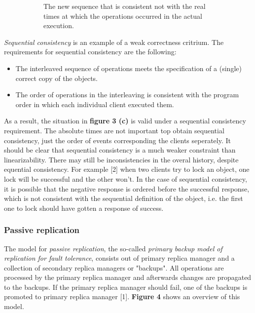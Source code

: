 \begin{figure}
\begin{subfigure}[t]{0.3\textwidth}
                                        \caption{The new sequence that is consistent not with the real times at which the operations occurred in the actual execution.}
                                        \label{figure:linearizability:c}
        \end{subfigure}
        \caption{}
        \label{figure:linearizability}
\end{figure}


\emph{Sequential consistency} is an example of a weak correctness critrium. The requirements for sequential consistency are the following:
\begin{itemize}
	\item The interleaved sequence of operations meets the specification of a (single) correct copy of the objects.
	\item The order of operations in the interleaving is consistent with the program order in which each individual client executed them.
\end{itemize}
As a result, the situation in \textbf{figure 3 (c)} is valid under a sequential consistency requirement. The absolute times are not important top obtain sequential consistency, just the order of events corresponding the clients seperately. It should be clear that sequential consistency is a much weaker constraint than linearizability. There may still be inconsistencies in the overal history, despite equential consistency. For example [2] when two clients try to lock an object, one lock will be successful and the other won't. In the case of sequential consistency, it is possible that the negative response is ordered before the successful response, which is not consistent with the sequential definition of the object, i.e. the first one to lock should have gotten a response of success.


\subsubsection{Passive replication}

The model for \emph{passive replication}, the so-called \emph{primary backup model of replication for fault tolerance}, consists out of primary replica manager and a collection of secondary replica managers or "backups". All operations are processed by the primary replica manager and afterwards changes are propagated to the backups. If the primary replica manager should fail, one of the backups is promoted to primary replica manager [1]. \textbf{Figure 4} shows an overview of this model.


